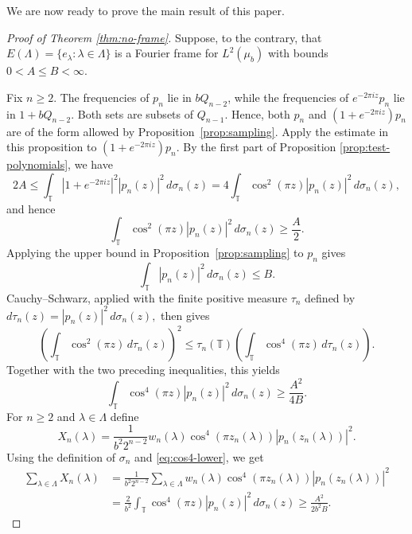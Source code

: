 \documentclass[reqno,a4paper,12pt]{amsart}
\def\T{{\mathbb T}}
\begin{document}
We are now ready to prove the main result of this paper.

\begin{proof}[Proof of Theorem \ref{thm:no-frame}]
Suppose, to the contrary, that $E(\Lambda)=\{e_\lambda:\lambda\in\Lambda\}$
is a Fourier frame for $L^2(\mu_b)$ with bounds $0<A\le B<\infty$.

Fix $n\ge2$. The frequencies of $p_n$ lie in $bQ_{n-2}$, while the
frequencies of $e^{-2\pi iz}p_n$ lie in $1+bQ_{n-2}$. Both sets are
subsets of $Q_{n-1}$. Hence, both $p_n$ and
$(1+e^{-2\pi iz})p_n$ are of the form allowed by Proposition~\ref{prop:sampling}. Apply the estimate in this proposition to
$(1+e^{-2\pi iz})p_n$. By the first part of
Proposition \ref{prop:test-polynomials}, we have
$$
        2A
        \le
        \int_{\T}|1+e^{-2\pi iz}|^2|p_n(z)|^2\,d\sigma_n(z)
        =
        4\int_{\T}\cos^2(\pi z)|p_n(z)|^2\,d\sigma_n(z),
$$
and hence
\begin{equation}\label{eq:cos2-lower}
        \int_{\T}\cos^2(\pi z)|p_n(z)|^2\,d\sigma_n(z)\ge \frac A2.
\end{equation}
Applying the upper bound in Proposition~\ref{prop:sampling} to $p_n$ gives
\begin{equation}\label{eq:pn-upper}
        \int_{\T}|p_n(z)|^2\,d\sigma_n(z)\le B.
\end{equation}
Cauchy--Schwarz, applied with the finite positive measure $\tau_n$ defined by
$
        d\tau_n(z)=|p_n(z)|^2\,d\sigma_n(z),
$
then gives
$$
\left(
        \int_{\T}\cos^2(\pi z)\,d\tau_n(z)
\right)^2
\le
\tau_n(\T)
\left(
        \int_{\T}\cos^4(\pi z)\,d\tau_n(z)
\right).
$$
Together with the two preceding inequalities, this yields
\begin{equation}\label{eq:cos4-lower}
        \int_{\T}\cos^4(\pi z)|p_n(z)|^2\,d\sigma_n(z)
        \ge
        \frac{A^2}{4B}.
\end{equation}
For $n\ge2$ and $\lambda\in\Lambda$ define
$$
        X_n(\lambda)
        =
        \frac1{b^2 2^{n-2}}
        w_n(\lambda)
        \cos^4(\pi z_n(\lambda))
        |p_n(z_n(\lambda))|^2.
$$
Using the definition of $\sigma_n$ and \eqref{eq:cos4-lower}, we get
\begin{equation}\label{eq:X-lower}
\begin{aligned}
        \sum_{\lambda\in\Lambda}X_n(\lambda)
        &=
        \frac1{b^2 2^{n-2}}
        \sum_{\lambda\in\Lambda}
        w_n(\lambda)\cos^4(\pi z_n(\lambda))
        |p_n(z_n(\lambda))|^2       \\
        &=
        \frac2{b^2}
        \int_{\T}\cos^4(\pi z)|p_n(z)|^2\,d\sigma_n(z)
        \ge
        \frac{A^2}{2b^2B}.
\end{aligned}
\end{equation}


\end{proof}
\end{document}
